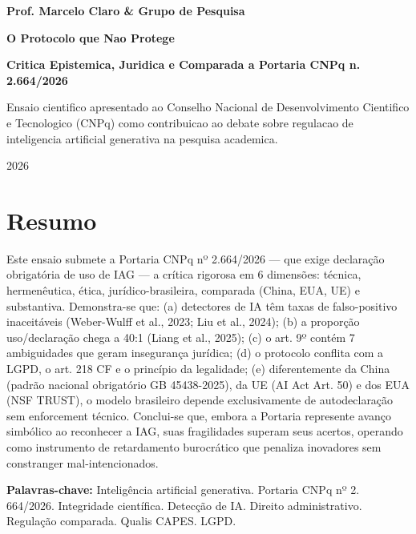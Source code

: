 \documentclass[
  12pt,
  a4paper,
  brazil
]{article}
\begin{document}
\begin{titlepage}
  \begin{center}
    \vspace*{3cm}
    {\large\bfseries Prof. Marcelo Claro \& Grupo de Pesquisa\par}
    \vspace{3cm}
    {\LARGE\bfseries O Protocolo que Nao Protege\par}
    \vspace{0.5cm}
    {\large\bfseries Critica Epistemica, Juridica e Comparada a Portaria CNPq n. 2.664/2026\par}
    \vspace{1.5cm}
    {\normalsize Ensaio cientifico apresentado ao Conselho Nacional de Desenvolvimento Cientifico e Tecnologico (CNPq) como contribuicao ao debate sobre regulacao de inteligencia artificial generativa na pesquisa academica.\par}
    \vfill
    {\large 2026\par}
  \end{center}
\end{titlepage}

\tableofcontents
\newpage

\section{Resumo}\label{resumo}

Este ensaio submete a Portaria CNPq nº 2.664/2026 --- que exige
declaração obrigatória de uso de IAG --- a crítica rigorosa em 6
dimensões: técnica, hermenêutica, ética, jurídico-brasileira, comparada
(China, EUA, UE) e substantiva. Demonstra-se que: (a) detectores de IA
têm taxas de falso-positivo inaceitáveis (Weber-Wulff et al., 2023; Liu
et al., 2024); (b) a proporção uso/declaração chega a 40:1 (Liang et
al., 2025); (c) o art. 9º contém 7 ambiguidades que geram insegurança
jurídica; (d) o protocolo conflita com a LGPD, o art. 218 CF e o
princípio da legalidade; (e) diferentemente da China (padrão nacional
obrigatório GB 45438-2025), da UE (AI Act Art. 50) e dos EUA (NSF
TRUST), o modelo brasileiro depende exclusivamente de autodeclaração sem
enforcement técnico. Conclui-se que, embora a Portaria represente avanço
simbólico ao reconhecer a IAG, suas fragilidades superam seus acertos,
operando como instrumento de retardamento burocrático que penaliza
inovadores sem constranger mal-intencionados.

\textbf{Palavras-chave:} Inteligência artificial generativa. Portaria
CNPq nº 2. 664/2026. Integridade científica. Detecção de IA. Direito
administrativo. Regulação comparada. Qualis CAPES. LGPD.
\end{document}
